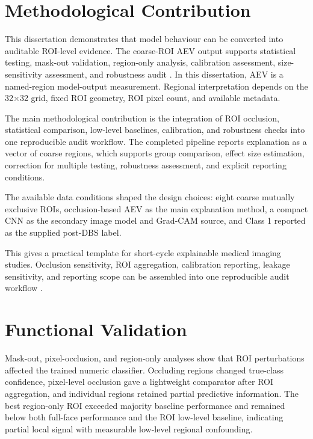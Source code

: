 
\section{Methodological Contribution}

This dissertation demonstrates that model behaviour can be converted into auditable ROI-level evidence. The coarse-ROI AEV output supports statistical testing, mask-out validation, region-only analysis, calibration assessment, size-sensitivity assessment, and robustness audit    . In this dissertation, AEV is a named-region model-output measurement. Regional interpretation depends on the 32$\times$32 grid, fixed ROI geometry, ROI pixel count, and available metadata.


The main methodological contribution is the integration of ROI occlusion, statistical comparison, low-level baselines, calibration, and robustness checks into one reproducible audit workflow. The completed pipeline reports explanation as a vector of coarse regions, which supports group comparison, effect size estimation, correction for multiple testing, robustness assessment, and explicit reporting conditions.


The available data conditions shaped the design choices: eight coarse mutually exclusive ROIs, occlusion-based AEV as the main explanation method, a compact CNN as the secondary image model and Grad-CAM source, and Class 1 reported as the supplied post-DBS label.


This gives a practical template for short-cycle explainable medical imaging studies. Occlusion sensitivity, ROI aggregation, calibration reporting, leakage sensitivity, and reporting scope can be assembled into one reproducible audit workflow    .


\section{Functional Validation}

Mask-out, pixel-occlusion, and region-only analyses show that ROI perturbations affected the trained numeric classifier. Occluding regions changed true-class confidence, pixel-level occlusion gave a lightweight comparator after ROI aggregation, and individual regions retained partial predictive information. The best region-only ROI exceeded majority baseline performance and remained below both full-face performance and the ROI low-level baseline, indicating partial local signal with measurable low-level regional confounding.


